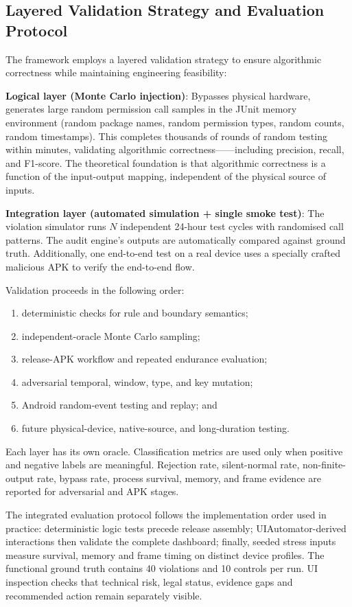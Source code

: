 \subsection{Layered Validation Strategy and Evaluation Protocol}

The framework employs a layered validation strategy to ensure algorithmic correctness while maintaining engineering feasibility:

\textbf{Logical layer (Monte Carlo injection)}: Bypasses physical hardware, generates large random permission call samples in the JUnit memory environment (random package names, random permission types, random counts, random timestamps). This completes thousands of rounds of random testing within minutes, validating algorithmic correctness——including precision, recall, and F1-score. The theoretical foundation is that algorithmic correctness is a function of the input-output mapping, independent of the physical source of inputs.

\textbf{Integration layer (automated simulation + single smoke test)}: The violation simulator runs $N$ independent 24-hour test cycles with randomised call patterns. The audit engine's outputs are automatically compared against ground truth. Additionally, one end-to-end test on a real device uses a specially crafted malicious APK to verify the end-to-end flow.

Validation proceeds in the following order:
\begin{enumerate}
\item deterministic checks for rule and boundary semantics;
\item independent-oracle Monte Carlo sampling;
\item release-APK workflow and repeated endurance evaluation;
\item adversarial temporal, window, type, and key mutation;
\item Android random-event testing and replay; and
\item future physical-device, native-source, and long-duration testing.
\end{enumerate}

Each layer has its own oracle. Classification metrics are used only when positive and negative labels are meaningful. Rejection rate, silent-normal rate, non-finite-output rate, bypass rate, process survival, memory, and frame evidence are reported for adversarial and APK stages.

The integrated evaluation protocol follows the implementation order used in practice: deterministic logic tests precede release assembly; UIAutomator-derived interactions then validate the complete dashboard; finally, seeded stress inputs measure survival, memory and frame timing on distinct device profiles. The functional ground truth contains 40 violations and 10 controls per run. UI inspection checks that technical risk, legal status, evidence gaps and recommended action remain separately visible.

